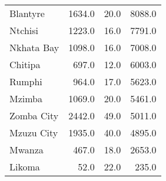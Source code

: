 \begin{tabular}{lrrr}
Blantyre      &      1634.0 &         20.0 &           8088.0 \\
Ntchisi       &      1223.0 &         16.0 &           7791.0 \\
Nkhata Bay    &      1098.0 &         16.0 &           7008.0 \\
Chitipa       &       697.0 &         12.0 &           6003.0 \\
Rumphi        &       964.0 &         17.0 &           5623.0 \\
Mzimba        &      1069.0 &         20.0 &           5461.0 \\
Zomba City    &      2442.0 &         49.0 &           5011.0 \\
Mzuzu City    &      1935.0 &         40.0 &           4895.0 \\
Mwanza        &       467.0 &         18.0 &           2653.0 \\
Likoma        &        52.0 &         22.0 &            235.0 \\
\bottomrule
\end{tabular}
